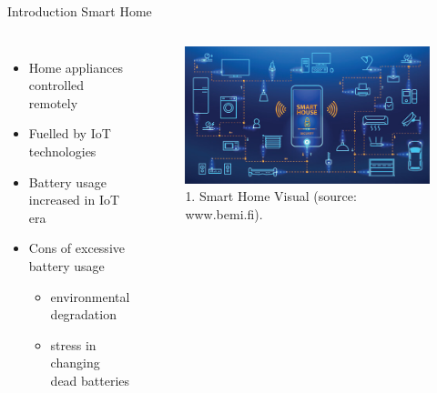 \documentclass [xcolor=svgnames, t] {beamer}
\begin{document}
\begin{frame}{Introduction }
Smart Home
 \begin{center}
\begin{columns}[onlytextwidth]
\begin{itemize}
    \item Home appliances controlled remotely
    \item Fuelled by IoT technologies
    \item Battery usage increased in IoT era
    \item Cons of excessive battery usage
        \begin{itemize}
            \item environmental degradation
            \item stress in changing dead batteries
        \end{itemize}
\end{itemize}

\begin{figure}
    \centering
    \includegraphics[width=1.0\textwidth]{smart-home-automation-2-1.jpg}
    \caption{1. Smart Home Visual (source: www.bemi.fi).}
    \label{fig:my_label}
\end{figure}

\end{columns}

\end{center}

\end{frame}
\end{document}
